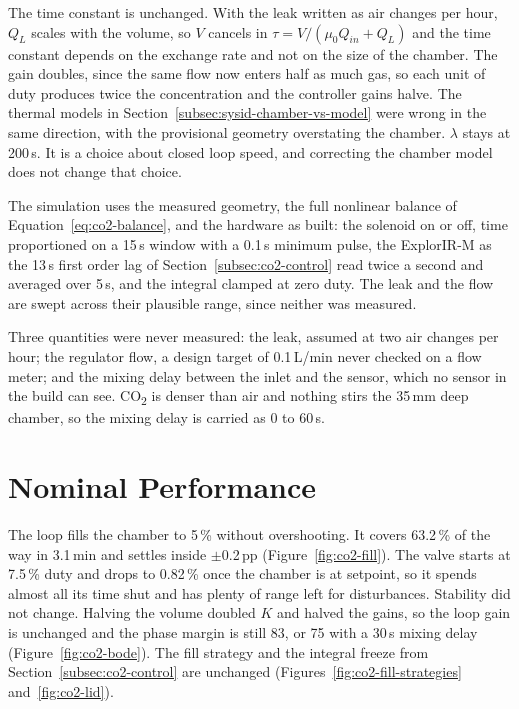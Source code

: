 The time constant is unchanged. With the leak written as air changes per hour, $Q_L$ scales with the volume, so $V$ cancels in $\tau = V/(\mu_0 Q_{in} + Q_L)$ and the time constant depends on the exchange rate and not on the size of the chamber. The gain doubles, since the same flow now enters half as much gas, so each unit of duty produces twice the concentration and the controller gains halve. The thermal models in Section~\ref{subsec:sysid-chamber-vs-model} were wrong in the same direction, with the provisional geometry overstating the chamber. $\lambda$ stays at 200\,s. It is a choice about closed loop speed, and correcting the chamber model does not change that choice.

The simulation uses the measured geometry, the full nonlinear balance of Equation~\ref{eq:co2-balance}, and the hardware as built: the solenoid on or off, time proportioned on a 15\,s window with a 0.1\,s minimum pulse, the ExplorIR-M as the 13\,s first order lag of Section~\ref{subsec:co2-control} read twice a second and averaged over 5\,s, and the integral clamped at zero duty. The leak and the flow are swept across their plausible range, since neither was measured.

Three quantities were never measured: the leak, assumed at two air changes per hour; the regulator flow, a design target of 0.1\,L/min never checked on a flow meter; and the mixing delay between the inlet and the sensor, which no sensor in the build can see. CO\textsubscript{2} is denser than air and nothing stirs the 35\,mm deep chamber, so the mixing delay is carried as 0 to 60\,s.

\section{Nominal Performance}
\label{sec:co2-nominal}


The loop fills the chamber to 5\,\% without overshooting. It covers 63.2\,\% of the way in 3.1\,min and settles inside $\pm$0.2\,pp (Figure~\ref{fig:co2-fill}). The valve starts at 7.5\,\% duty and drops to 0.82\,\% once the chamber is at setpoint, so it spends almost all its time shut and has plenty of range left for disturbances. Stability did not change. Halving the volume doubled $K$ and halved the gains, so the loop gain is unchanged and the phase margin is still 83\textdegree{}, or 75\textdegree{} with a 30\,s mixing delay (Figure~\ref{fig:co2-bode}). The fill strategy and the integral freeze from Section~\ref{subsec:co2-control} are unchanged (Figures~\ref{fig:co2-fill-strategies} and~\ref{fig:co2-lid}).


